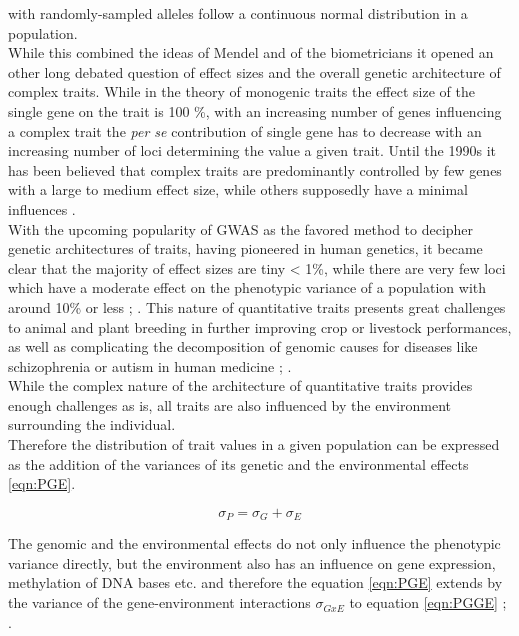 with randomly-sampled alleles follow a continuous normal distribution in a
population. \\
While this combined the ideas of Mendel and of the biometricians it opened an other long
debated question of effect sizes and the overall genetic architecture of complex
traits. While in the theory of monogenic traits the effect size of the single gene on the
trait is 100 \%, with an increasing number of genes influencing a complex trait the
\textit{per se} contribution of single gene has to decrease with an increasing number of
loci determining the value a given trait. Until the 1990s it has been believed that
complex traits are predominantly controlled by few genes with a
large to medium effect size, while others supposedly have a minimal influences \cite{zhang2018esti}. \\
With the upcoming popularity of GWAS as the favored method to decipher genetic
architectures of traits, having pioneered in human genetics, it became clear that the
majority of effect sizes are tiny < 1\%, while there are very few loci which have a
moderate effect on the phenotypic variance of a population with around 10\% or less
\cite{korte2013advantages}; \cite{stringer2011}. This nature of quantitative traits
presents great challenges to animal \cite{goddard2009} and plant breeding
\cite{wurschum2012} in further improving crop or livestock performances, as well as
complicating the decomposition of genomic causes for diseases like schizophrenia or autism in human medicine \cite{de2014}; \cite{purcell2014}. \\
While the complex nature of the architecture of quantitative traits provides enough
challenges as is, all traits are also influenced by the environment surrounding the individual.\\
Therefore the distribution of trait values in a given population can be expressed as the
addition of the variances of its genetic and the environmental effects \ref{eqn:PGE}.

\begin{equation}
 \sigma_{P} = \sigma_{G} + \sigma_{E}
 \label{eqn:PGE}
\end{equation}

The genomic and the environmental effects do not only influence the phenotypic variance directly, but
the environment also has an influence on gene expression, methylation of DNA bases etc. and
therefore the equation \ref{eqn:PGE} extends by the variance of the gene-environment
interactions $\sigma_{GxE}$  to equation \ref{eqn:PGGE}  \cite{lynch1998}; \cite{walsh2018}.
    
